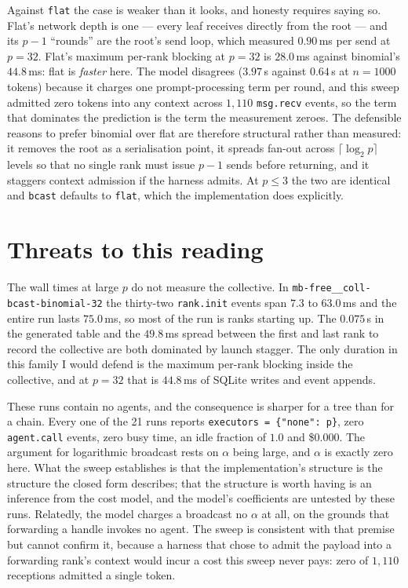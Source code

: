 \documentclass[11pt]{article}
\begin{document}
Against \texttt{flat} the case is weaker than it looks, and honesty requires saying so. Flat's
network depth is one --- every leaf receives directly from the root --- and its $p-1$
``rounds'' are the root's send loop, which measured $0.90$\,ms per send at $p=32$. Flat's
maximum per-rank blocking at $p=32$ is $28.0$\,ms against binomial's $44.8$\,ms: flat is
\emph{faster} here. The model disagrees ($3.97$\,s against $0.64$\,s at $n=1000$ tokens)
because it charges one prompt-processing term per round, and this sweep admitted zero tokens
into any context across $1{,}110$ \texttt{msg.recv} events, so the term that dominates the
prediction is the term the measurement zeroes. The defensible reasons to prefer binomial over
flat are therefore structural rather than measured: it removes the root as a serialisation
point, it spreads fan-out across $\lceil\log_2 p\rceil$ levels so that no single rank must
issue $p-1$ sends before returning, and it staggers context admission if the harness admits.
At $p \le 3$ the two are identical and \texttt{bcast} defaults to \texttt{flat}, which the
implementation does explicitly.

\section{Threats to this reading}

The wall times at large $p$ do not measure the collective. In
\texttt{mb-free\_\_coll-bcast-binomial-32} the thirty-two \texttt{rank.init} events span
$7.3$ to $63.0$\,ms and the entire run lasts $75.0$\,ms, so most of the run is ranks starting
up. The $0.075$\,s in the generated table and the $49.8$\,ms spread between the first and last
rank to record the collective are both dominated by launch stagger. The only duration in this
family I would defend is the maximum per-rank blocking inside the collective, and at $p=32$
that is $44.8$\,ms of SQLite writes and event appends.

These runs contain no agents, and the consequence is sharper for a tree than for a chain.
Every one of the 21 runs reports \texttt{executors = \{"none": p\}}, zero \texttt{agent.call}
events, zero busy time, an idle fraction of $1.0$ and \$0.000. The argument for logarithmic
broadcast rests on $\alpha$ being large, and $\alpha$ is exactly zero here. What the sweep
establishes is that the implementation's structure is the structure the closed form describes;
that the structure is worth having is an inference from the cost model, and the model's
coefficients are untested by these runs. Relatedly, the model charges a broadcast no $\alpha$
at all, on the grounds that forwarding a handle invokes no agent. The sweep is consistent with
that premise but cannot confirm it, because a harness that chose to admit the payload into a
forwarding rank's context would incur a cost this sweep never pays: zero of $1{,}110$
receptions admitted a single token.
\end{document}
